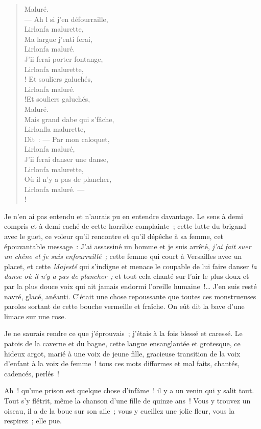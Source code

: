 \documentclass[french,twoside]{book} %
\begin{document}
\begin{verse}
Maluré.\\
 — Ah l si j’en défourraille,\\
Lirlonfa malurette,\\
Ma largue j’enti ferai,\\
Lirlonfa maluré.\\
J’ii ferai porter fontange,\\
Lirlonfa malurette,\\! Et souliers galuchés,\\
Lirlonfa maluré.\\!Et souliers galuchés,\\
Maluré.\\
Mais grand dabe qui s’fâche,\\
Lirlonfla malurette,\\
Dit : — Par mon caloquet,\\
Lirlonfa maluré,\\
J’ii ferai danser une danse,\\
Lirlonfa malurette,\\
Où il n’y a pas de plancher,\\
Lirlonfa maluré. — \\!
\end{verse}

\noindent Je n’en ai pas entendu et n’aurais pu en entendre davantage. Le sens à demi compris et à demi caché de cette horrible complainte ; cette lutte du brigand avec le guet, ce voleur qu’il rencontre et qu’il dépêche à sa femme, cet épouvantable message : J’ai assassiné un homme et je suis arrêté, \emph{j’ai fait suer un chêne et je suis enfourraillé ;} cette femme qui court à Versailles avec un placet, et cette \emph{Majesté} qui s’indigne et menace le coupable de lui faire danser \emph{la danse où il n’y a pas de plancher ;} et tout cela chanté sur l’air le plus doux et par la plus douce voix qui ait jamais endormi l’oreille humaine !… J’en suis resté navré, glacé, anéanti. C’était une chose repoussante que toutes ces monstrueuses paroles sortant de cette bouche vermeille et fraîche. On eût dit la bave d’une limace sur une rose.\par
Je ne saurais rendre ce que j’éprouvais ; j’étais à la fois blessé et caressé. Le patois de la caverne et du bagne, cette langue ensanglantée et grotesque, ce  hideux argot, marié à une voix de jeune fille, gracieuse transition de la voix d’enfant à la voix de femme ! tous ces mots difformes et mal faits, chantés, cadencés, perlés !\par
Ah ! qu’une prison est quelque chose d’infâme ! il y a un venin qui y salit tout. Tout s’y flétrit, même la chanson d’une fille de quinze ans ! Vous y trouvez un oiseau, il a de la boue sur son aile ; vous y cueillez une jolie fleur, vous la respirez ; elle pue.
\end{document}
